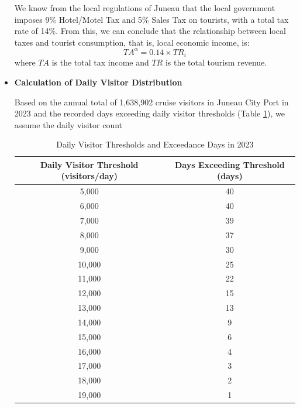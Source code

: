 \documentclass{mcmthesis}
\begin{document}
\begin{itemize}
  We know from the local regulations of Juneau that the local government imposes 9\% Hotel/Motel Tax and 5\% Sales Tax on tourists, with a total tax rate of 14\%. From this, we can conclude that the relationship between local taxes and tourist consumption, that is, local economic income, is:
  $$TA^\alpha = 0.14 \times TR_i$$
  where $TA$ is the total tax income and $TR$ is the total tourism revenue.
  \item \textbf{Calculation of Daily Visitor Distribution}\par
  Based on the annual total of 1,638,902 cruise visitors in Juneau City Port in 2023 and the recorded days exceeding daily visitor thresholds (Table \ref{tab:thresholds}), we assume the daily visitor count
  \begin{table}[h!]
    \centering
    \label{tab:thresholds}
    \begin{tabular}{cc}
      \toprule
      \rowcolor{gray!20} %
      \textbf{Daily Visitor Threshold (visitors/day)} & \textbf{Days Exceeding Threshold (days)} \\
      \midrule
      5,000  & 40 \\
      6,000  & 40 \\
      7,000  & 39 \\
      8,000  & 37 \\
      9,000  & 30 \\
      10,000 & 25 \\
      11,000 & 22 \\
      12,000 & 15 \\
      13,000 & 13 \\
      14,000 & 9  \\
      15,000 & 6  \\
      16,000 & 4  \\
      17,000 & 3  \\
      18,000 & 2  \\
      19,000 & 1  \\
      \bottomrule
    \end{tabular}
    \caption{Daily Visitor Thresholds and Exceedance Days in 2023}
  \end{table}


\end{itemize}
\end{document}
